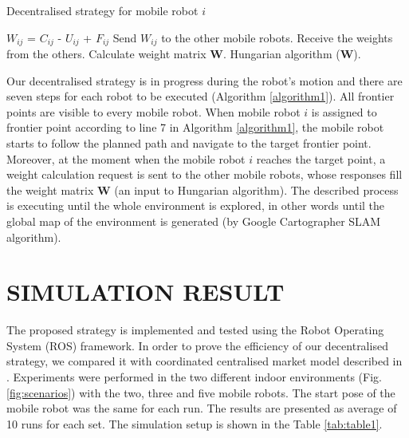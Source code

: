 \documentclass[letterpaper, 10 pt, conference]{ieeeconf}  %
\begin{document}
\begin{algorithm}[H]
\caption{Decentralised strategy for mobile robot $i$}
\label{algorithm1}
\begin{algorithmic}[1]
\State\hspace{\algorithmicindent} $W_{ij}$ = $C_{ij}$ - $U_{ij}$ + $F_{ij}$
\State\hspace{\algorithmicindent} Send $W_{ij}$ to the other mobile robots.
\State \hspace{\algorithmicindent} Receive the weights from the others.
\State \hspace{\algorithmicindent} Calculate weight matrix $\boldsymbol{W}$.
\State \hspace{\algorithmicindent} Hungarian algorithm ($\boldsymbol{W}$).
\EndFor
\end{algorithmic}
\end{algorithm}
Our decentralised strategy is in progress during the robot's motion and there are seven steps for each robot to be executed (Algorithm \ref{algorithm1}).  All frontier points are visible to every mobile robot.
When mobile robot $i$ is assigned to frontier point according to line 7 in Algorithm \ref{algorithm1}, the mobile robot starts to follow the planned path and navigate to the target frontier point. Moreover, at the moment when the mobile robot $i$ reaches the target point, a weight calculation request is sent to the other mobile robots, whose responses fill the  weight matrix $\boldsymbol{W}$ (an input to Hungarian algorithm). The described process is executing until the whole environment is explored, in other words until the global map of the environment is generated (by Google Cartographer SLAM algorithm).

\section{SIMULATION RESULT}

The proposed strategy is implemented and tested using the Robot Operating System (ROS) framework. In order to prove the efficiency of our decentralised strategy, we compared it with coordinated centralised market model described in \cite{burgard}. Experiments were performed in the two different indoor environments (Fig. \ref{fig:scenarios}) with the two, three and five mobile robots. The start pose of the mobile robot was the same for each run. The results are presented as average of 10 runs for each set. The simulation setup is shown in the Table \ref{tab:table1}.
\end{document}
